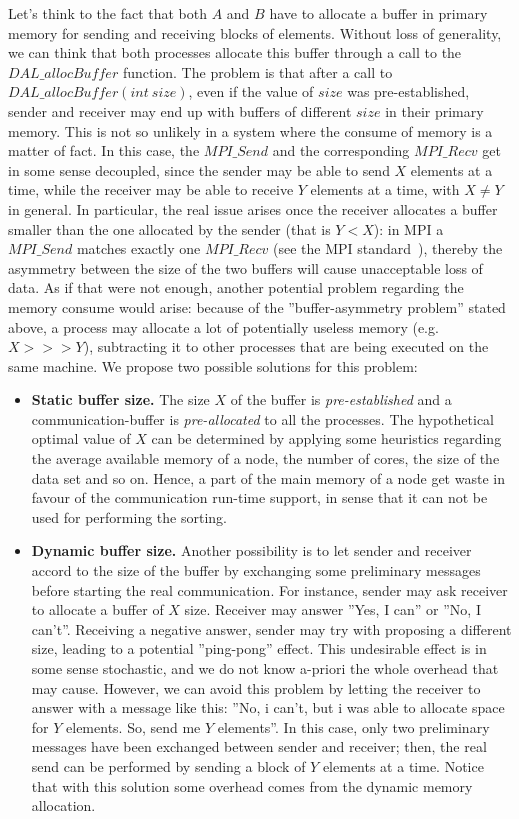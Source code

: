 Let's think to the fact that both $A$ and $B$ have to allocate a buffer in primary memory for sending and receiving blocks of elements. Without loss of generality, we can think that both processes allocate this buffer through a call to the $DAL\_allocBuffer$ function. The problem is that after a call to $DAL\_allocBuffer( int\ size )$, even if the value of $size$ was pre-established, sender and receiver may end up with buffers of different $size$ in their primary memory. This is not so unlikely in a system where the consume of memory is a matter of fact. In this case, the $MPI\_Send$ and the corresponding $MPI\_Recv$ get in some sense decoupled, since the sender may be able to send $X$ elements at a time, while the receiver may be able to receive $Y$ elements at a time, with $X \neq Y$ in general. In particular, the real issue arises once the receiver allocates a buffer smaller than the one allocated by the sender (that is $Y < X$): in MPI a $MPI\_Send$ matches exactly one $MPI\_Recv$ (see the MPI standard~\cite{MPI}), thereby the asymmetry between the size of the two buffers will cause unacceptable loss of data. As if that were not enough, another potential problem regarding the memory consume would arise: because of the ''buffer-asymmetry problem'' stated above, a process may allocate a lot of potentially useless memory (e.g. $X >>> Y$), subtracting it to other processes that are being executed on the same machine. We propose two possible solutions for this problem: 
\begin{itemize}
\item \textbf{Static buffer size.} The size $X$ of the buffer is \textit{pre-established} and a communication-buffer is \textit{pre-allocated} to all the processes. The hypothetical optimal value of $X$ can be determined by applying some heuristics regarding the average available memory of a node, the number of cores, the size of the data set and so on. Hence, a part of the main memory of a node get waste in favour of the communication run-time support, in sense that it can not be used for performing the sorting. 
\item \textbf{Dynamic buffer size.} Another possibility is to let sender and receiver accord to the size of the buffer by exchanging some preliminary messages before starting the real communication. For instance, sender may ask receiver to allocate a buffer of $X$ size. Receiver may answer ''Yes, I can'' or ''No, I can't''. Receiving a negative answer, sender may try with proposing a different size, leading to a potential ''ping-pong'' effect. This undesirable effect is in some sense stochastic, and we do not know a-priori the whole overhead that may cause. However, we can avoid this problem by letting the receiver to answer with a message like this: ''No, i can't, but i was able to allocate space for $Y$ elements. So, send me $Y$ elements''. In this case, only two preliminary messages have been exchanged between sender and receiver; then, the real send can be performed by sending a block of $Y$ elements at a time. Notice that with this solution some overhead comes from the dynamic memory allocation. 
\end{itemize}
